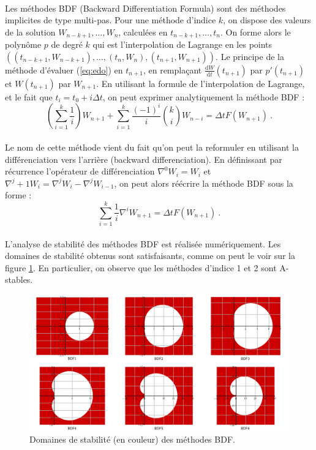     \paragraph{}
    Les méthodes BDF (Backward Differentiation Formula) sont des méthodes implicites de type multi-pas.
    Pour une méthode d'indice $k$, on dispose des valeurs de la solution $W_{n-k+1}, \dots, W_n$, calculées en $t_{n-k+1}, \dots, t_n$.
    On forme alors le polynôme $p$ de degré $k$ qui est l'interpolation de Lagrange en les points $\left(\left(t_{n-k+1}, W_{n-k+1}\right), \dots, \left(t_n, W_n\right), \left(t_{n+1}, W_{n+1}\right)\right)$.
    Le principe de la méthode d'évaluer (\ref{eq:edo}) en $t_{n+1}$, en remplaçant $\frac{\mathrm{d}W}{\mathrm{d}t}\left(t_{n+1}\right)$ par $p'\left(t_{n+1}\right)$ et $W\left(t_{n+1}\right)$ par $W_{n+1}$.
    En utilisant la formule de l'interpolation de Lagrange, et le fait que $t_i = t_0 + i\Delta t$, on peut exprimer analytiquement la méthode BDF :
    \[\left(\sum_{i=1}^k\frac{1}{i}\right)W_{n+1} + \sum_{i=1}^k\frac{\left(-1\right)^i}{i}\binom{k}{i}W_{n-i} = \Delta tF\left(W_{n+1}\right)\ .\]

    \paragraph{}
    Le nom de cette méthode vient du fait qu'on peut la reformuler en utilisant la différenciation vers l'arrière (backward differenciation).
    En définissant par récurrence l'opérateur de différenciation $\nabla^0W_i = W_i$ et $\nabla^j+1W_i = \nabla^jW_i - \nabla^jW_{i-1}$, on peut alors réécrire la méthode BDF sous la forme :
    \[\sum_{i=1}^k\frac{1}{i}\nabla^iW_{n+1} = \Delta tF\left(W_{n+1}\right)\ .\]

    \paragraph{}
    L'analyse de stabilité des méthodes BDF est réalisée numériquement.
    Les domaines de stabilité obtenus sont satisfaisants, comme on peut le voir sur la figure \ref{fig:bdf_stab}.
    En particulier, on observe que les méthodes d'indice 1 et 2 sont A-stables.

    \begin{figure}
      \centering
      \includegraphics[width=\textwidth]{images/bdf_stab.png}
      \caption{Domaines de stabilité (en couleur) des méthodes BDF.}
      \label{fig:bdf_stab}
    \end{figure}

